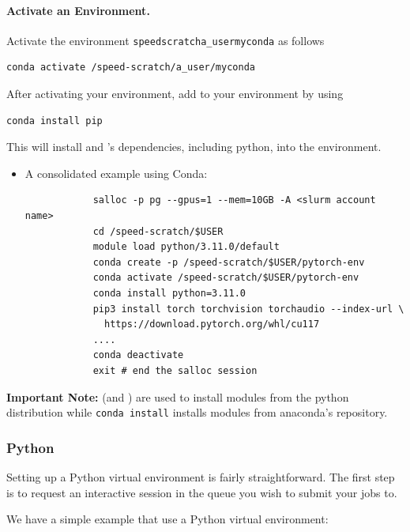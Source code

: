 \documentclass{easychair}
\begin{document}
\paragraph{Activate an Environment.}

Activate the environment \texttt{\/speed\-scratch\/a\_user\/myconda} as follows
\begin{verbatim}
conda activate /speed-scratch/a_user/myconda
\end{verbatim}
After activating your environment, add  to your environment by using 
\begin{verbatim}
conda install pip
\end{verbatim}
This will install  and 's dependencies, including python, 
into the environment.

\begin{itemize}
	\item
		A consolidated example using Conda:
		\small
		\begin{verbatim}
			salloc -p pg --gpus=1 --mem=10GB -A <slurm account name>
			cd /speed-scratch/$USER
			module load python/3.11.0/default
			conda create -p /speed-scratch/$USER/pytorch-env
			conda activate /speed-scratch/$USER/pytorch-env
			conda install python=3.11.0
			pip3 install torch torchvision torchaudio --index-url \ 
			  https://download.pytorch.org/whl/cu117
			....
			conda deactivate
			exit # end the salloc session
		\end{verbatim}
		\normalsize
\end{itemize}

\noindent
\textbf{Important Note:}  (and ) are used to install modules
from the python distribution while \texttt{conda install} installs modules from 
anaconda's repository.

\subsubsection{Python}
\label{sect:python-venv}

Setting up a Python virtual environment is fairly straightforward.
The first step is to request an interactive session in the queue you wish to submit your jobs to.

We have a simple example that use a Python virtual environment:
\end{document}
